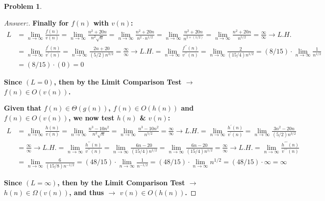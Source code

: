 \documentclass[11pt]{article}
\theoremstyle{definition}
\theoremstyle{definition}
\newtheorem{required}{Problem}
\theoremstyle{definition}
\begin{document}
\begin{required}
\begin{enumerate} [label=(\alph*)]
\begin{proof}[Answer:]
\item \textbf{Finally for $f(n)$ with $v(n)$:}
\begin{align*}
L &= \lim_{n \to \infty} \frac{f(n)}{v(n)} = \lim_{n \to \infty} \frac{n^2+20n}{n^2\sqrt{n}} = \lim_{n \to \infty} \frac{n^2+20n}{n^2\cdot n^{1/2}} = \lim_{n \to \infty} \frac{n^2+20n}{n^{2+(1/2)}}  = \lim_{n \to \infty} \frac{n^2+20n}{n^{5/2}} = \frac{\infty}{\infty} \to L.H. \\
&= \lim_{n \to \infty} \frac{f^{\prime}(n)}{v^{\prime}(n)} =  \lim_{n \to \infty} \frac{2n+20}{(5/2)n^{3/2}} = \frac{\infty}{\infty} \to L.H. = \lim_{n \to \infty} \frac{f^{\prime\prime}(n)}{v^{\prime\prime}(n)} = \lim_{n \to \infty} \frac{2}{(15/4)n^{1/2}} = (8/15) \cdot \lim_{n \to \infty} \frac{1}{n^{1/2}} \\
&= (8/15) \cdot (0) = 0
\end{align*}
\item \textbf{Since $(L = 0)$, then by the Limit Comparison Test $\to$ $f(n) \in O(v(n))$.}

\item \textbf{Given that $f(n) \in \Theta(g(n))$, $f(n) \in O(h(n))$ and $f(n) \in O(v(n))$, we now test $h(n)$ \& $v(n)$:}
\begin{align*}
L &= \lim_{n \to \infty} \frac{h(n)}{v(n)} = \lim_{n \to \infty} \frac{n^3-10n^2}{n^2\sqrt{n}} = \lim_{n \to \infty} \frac{n^3-10n^2}{n^{5/2}} = \frac{\infty}{\infty} \to L.H. = \lim_{n \to \infty} \frac{h^{\prime}(n)}{v^{\prime}(n)} = \lim_{n \to \infty} \frac{3n^2-20n}{(5/2)n^{3/2}} \\
&= \frac{\infty}{\infty} \to L.H. = \lim_{n \to \infty} \frac{h^{\prime\prime}(n)}{v^{\prime\prime}(n)} = \lim_{n \to \infty} \frac{6n-20}{(15/4)n^{1/2}} = \lim_{n \to \infty} \frac{6n-20}{(15/4)n^{1/2}} = \frac{\infty}{\infty} \to L.H. = \lim_{n \to \infty} \frac{h^{\prime\prime\prime}(n)}{v^{\prime\prime\prime}(n)} \\
&= \lim_{n \to \infty} \frac{6}{(15/8)n^{-1/2}} = (48/15) \cdot \lim_{n \to \infty} \frac{1}{n^{-1/2}} = (48/15) \cdot \lim_{n \to \infty} n^{1/2} = (48/15) \cdot \infty = \infty
\end{align*}
\item \textbf{Since $(L = \infty)$, then by the Limit Comparison Test $\to$ $h(n) \in \Omega(v(n))$, and thus $\to$ $v(n) \in O(h(n))$.}


\end{proof}
\end{enumerate}
\end{required}
\end{document}
